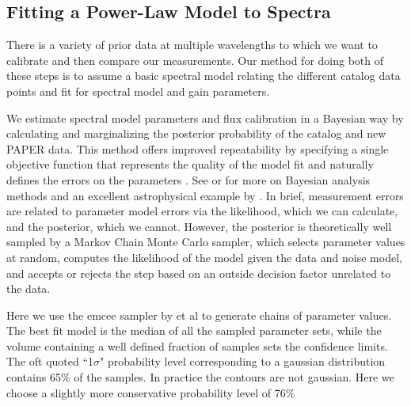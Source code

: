 \documentclass[preprint]{aastex}
\begin{document}


\subsection{Fitting a Power-Law Model to Spectra}


There is a variety of prior data at multiple wavelengths to which we want to calibrate
and then compare our measurements.  Our method for doing both of these steps
is to assume a basic spectral model relating the different catalog data points and
fit for spectral model and gain parameters. 

We estimate spectral model parameters and flux calibration in a
Bayesian way by calculating and marginalizing the posterior probability of the
catalog and new PAPER data.   This method
offers improved repeatability by specifying a single objective function that
represents the quality of the model fit and naturally defines the errors on the
parameters \citep{Hogg:2010p8759}.   See  \citet{Mackay:2003p9717}  or
\citet{Sivia:2006p9736} for more on Bayesian analysis methods and an excellent
astrophysical example by \cite{Press:1997p9783}. In brief, measurement errors
are related to parameter model errors via the likelihood, which we can calculate, 
and the posterior, which we cannot.  However, the posterior is theoretically
well sampled by a Markov Chain Monte Carlo sampler, which selects parameter
values at random, computes the likelihood of the model given the data and noise model,
and accepts or rejects the step based on an outside decision factor unrelated to the data.


Here we use the emcee sampler by \citet{Mackay:2003p9717} et al to generate chains of
parameter values. The best fit model is the median of all the sampled
parameter sets, while the volume containing a well defined fraction of samples
sets the confidence limits.  The oft quoted ``1$\sigma$" probability level
corresponding to a gaussian distribution contains 65\% of the samples. In
practice the contours are not gaussian. Here we choose a slightly more
conservative probability level of 76\% 
\end{document}
